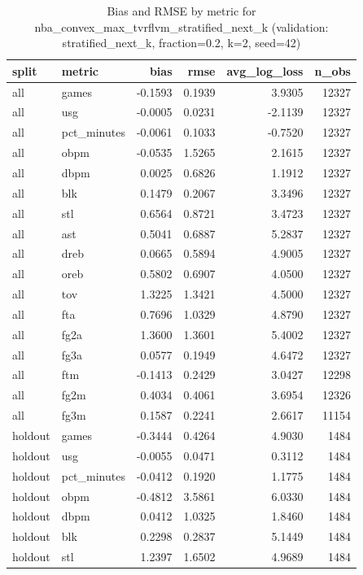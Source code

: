 \begin{table}
\caption{Bias and RMSE by metric for nba_convex_max_tvrflvm_stratified_next_k (validation: stratified_next_k, fraction=0.2, k=2, seed=42)}
\label{tab:nba_convex_max_tvrflvm_stratified_next_k_vs_stratified_next_k_f20_k2_s42_bias_rmse}
\begin{tabular}{llrrrr}
\toprule
split & metric & bias & rmse & avg\_log\_loss & n\_obs \\
\midrule
all & games & -0.1593 & 0.1939 & 3.9305 & 12327 \\
all & usg & -0.0005 & 0.0231 & -2.1139 & 12327 \\
all & pct\_minutes & -0.0061 & 0.1033 & -0.7520 & 12327 \\
all & obpm & -0.0535 & 1.5265 & 2.1615 & 12327 \\
all & dbpm & 0.0025 & 0.6826 & 1.1912 & 12327 \\
all & blk & 0.1479 & 0.2067 & 3.3496 & 12327 \\
all & stl & 0.6564 & 0.8721 & 3.4723 & 12327 \\
all & ast & 0.5041 & 0.6887 & 5.2837 & 12327 \\
all & dreb & 0.0665 & 0.5894 & 4.9005 & 12327 \\
all & oreb & 0.5802 & 0.6907 & 4.0500 & 12327 \\
all & tov & 1.3225 & 1.3421 & 4.5000 & 12327 \\
all & fta & 0.7696 & 1.0329 & 4.8790 & 12327 \\
all & fg2a & 1.3600 & 1.3601 & 5.4002 & 12327 \\
all & fg3a & 0.0577 & 0.1949 & 4.6472 & 12327 \\
all & ftm & -0.1413 & 0.2429 & 3.0427 & 12298 \\
all & fg2m & 0.4034 & 0.4061 & 3.6954 & 12326 \\
all & fg3m & 0.1587 & 0.2241 & 2.6617 & 11154 \\
holdout & games & -0.3444 & 0.4264 & 4.9030 & 1484 \\
holdout & usg & -0.0055 & 0.0471 & 0.3112 & 1484 \\
holdout & pct\_minutes & -0.0412 & 0.1920 & 1.1775 & 1484 \\
holdout & obpm & -0.4812 & 3.5861 & 6.0330 & 1484 \\
holdout & dbpm & 0.0412 & 1.0325 & 1.8460 & 1484 \\
holdout & blk & 0.2298 & 0.2837 & 5.1449 & 1484 \\
holdout & stl & 1.2397 & 1.6502 & 4.9689 & 1484 \\

\end{tabular}
\end{table}
